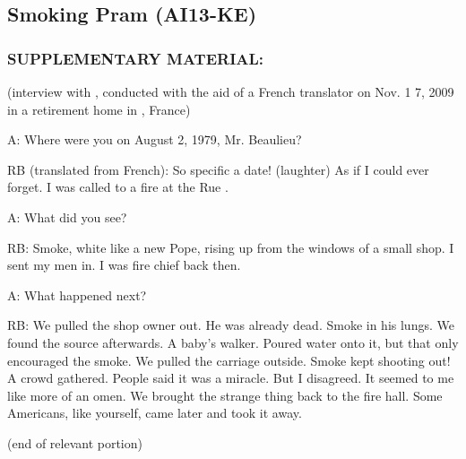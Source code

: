 \subsection*{Smoking Pram (AI13-KE)}
\subsubsection*{SUPPLEMENTARY MATERIAL:}
\par (interview with , conducted with the aid of a French
translator on Nov. 1 7, 2009 in a retirement home in ,
France)
\par A: Where were you on August 2, 1979, Mr. Beaulieu?
\par RB (translated from French): So specific a date! (laughter) As if I
could ever forget. I was called to a fire at the Rue .
\par A: What did you see?
\par RB: Smoke, white like a new Pope, rising up from the windows of
a small shop. I sent my men in. I was fire chief back then.
\par A: What happened next?
\par RB: We pulled the shop owner out. He was already dead. Smoke
in his lungs. We found the source afterwards. A baby's walker.
Poured water onto it, but that only encouraged the smoke. We
pulled the carriage outside. Smoke kept shooting out! A crowd
gathered. People said it was a miracle. But I disagreed. It seemed
to me like more of an omen. We brought the strange thing back to
the fire hall. Some Americans, like yourself, came later and took it
away.
\par (end of relevant portion)